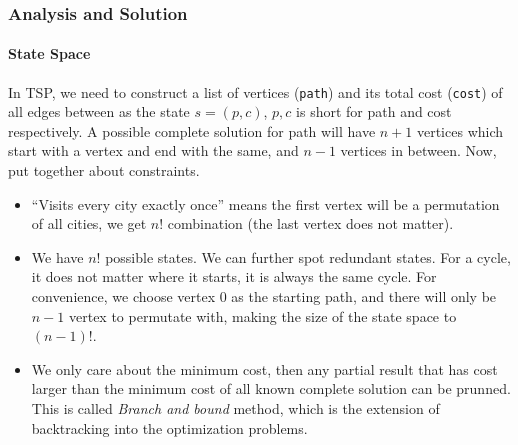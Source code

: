 \documentclass[../main.tex]{subfiles}
\begin{document}
\subsubsection{Analysis and Solution}
\paragraph{State Space} In TSP, we need to construct a list of vertices (\texttt{path}) and its total cost (\texttt{cost}) of all edges between as the state $s=(p, c)$, $p, c$ is short for path and cost respectively. A possible complete solution for path will have $n+1$ vertices which start with a vertex and end with the same, and $n-1$ vertices in between. Now, put together about constraints.
\begin{itemize}
    \item ``Visits every city exactly once'' means the first vertex will be a permutation of all cities, we get $n!$ combination (the last vertex does not matter).
    \item We have $n!$ possible states. We can further spot redundant states. For a cycle, it does not matter where it starts, it is always the same cycle. For convenience, we choose vertex $0$ as the starting path, and there will only be $n-1$ vertex to permutate with, making the size of the state space to $(n-1)!$. 
    \item We only care about the minimum cost, then any partial result that has cost larger than the  minimum cost of all known complete solution can be prunned. This is called \textit{Branch and bound} method, which is the extension of backtracking into the optimization problems.
\end{itemize}
\end{document}
